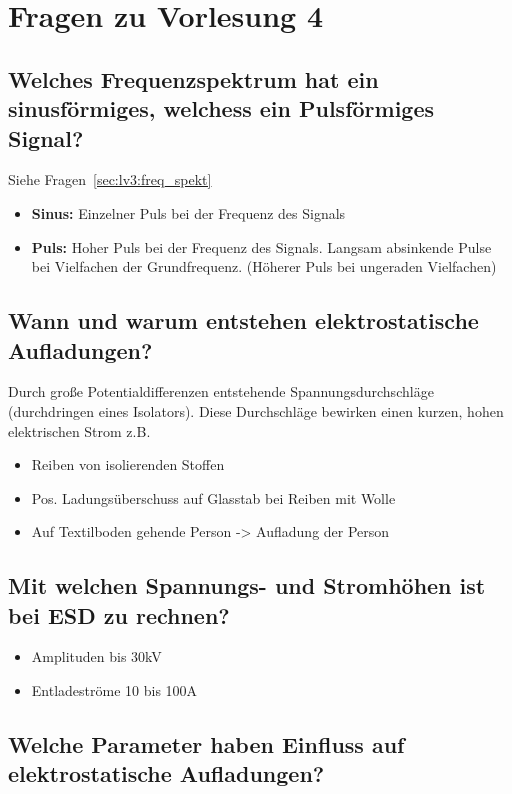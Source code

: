 \section{Fragen zu Vorlesung 4}

\subsection{Welches Frequenzspektrum hat ein sinusförmiges, welchess ein Pulsförmiges Signal?}
Siehe Fragen~\ref{sec:lv3:freq_spekt}
\begin{itemize}
  \item \textbf{Sinus:} Einzelner Puls bei der Frequenz des Signals
  \item \textbf{Puls:} Hoher Puls bei der Frequenz des Signals. Langsam absinkende Pulse bei Vielfachen der Grundfrequenz. (Höherer Puls bei ungeraden Vielfachen)
\end{itemize}

\subsection{Wann und warum entstehen elektrostatische Aufladungen?}\label{sec:lv4:electrostatic}
Durch große Potentialdifferenzen entstehende Spannungsdurchschläge (durchdringen eines Isolators). Diese Durchschläge bewirken einen kurzen, hohen elektrischen Strom\p
z.B.
\begin{itemize}
  \item Reiben von isolierenden Stoffen
  \item Pos. Ladungsüberschuss auf Glasstab bei Reiben mit Wolle
  \item Auf Textilboden gehende Person -> Aufladung der Person
\end{itemize}

\subsection{Mit welchen Spannungs- und Stromhöhen ist bei ESD zu rechnen?}
\begin{itemize}
  \item Amplituden bis 30kV
  \item Entladeströme 10 bis 100A
\end{itemize}

\subsection{Welche Parameter haben Einfluss auf elektrostatische Aufladungen?}


